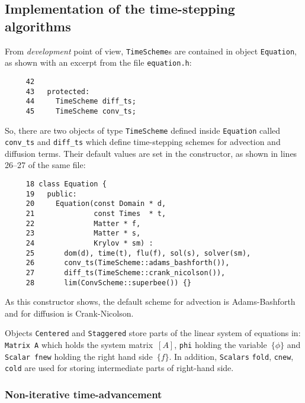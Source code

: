 \subsection{Implementation of the time-stepping algorithms}

\noindent
From {\em development} point of view, {\tt TimeScheme}s are contained in object 
{\tt Equation}, as shown with an excerpt from the file 
{\tt equation.h}:
%
{\small \begin{verbatim}
     42
     43   protected:
     44     TimeScheme diff_ts;
     45     TimeScheme conv_ts;
\end{verbatim}}
%
So, there are two objects of type {\tt TimeScheme} defined inside {\tt Equation}
called {\tt conv\_ts} and {\tt diff\_ts} which define time-stepping schemes for
advection and diffusion terms. Their default values are set in the constructor,
as shown in lines 26--27 of the same file:
%
{\small \begin{verbatim}
     18 class Equation {
     19   public:
     20     Equation(const Domain * d,
     21              const Times  * t,
     22              Matter * f,
     23              Matter * s,
     24              Krylov * sm) :
     25       dom(d), time(t), flu(f), sol(s), solver(sm),
     26       conv_ts(TimeScheme::adams_bashforth()),
     27       diff_ts(TimeScheme::crank_nicolson()),
     28       lim(ConvScheme::superbee()) {}
\end{verbatim}}
%
As this constructor shows, the default scheme for advection is Adams-Bashforth
and for diffusion is Crank-Nicolson.  

Objects {\tt Centered} and {\tt Staggered} store parts of the linear system of
equations in: {\tt Matrix A} which holds the system matrix~$[A]$, {\tt phi} 
holding the variable~$\{\phi\}$ and {\tt Scalar fnew} holding the right hand
side~$\{f\}$. In addition, {\tt Scalars} {\tt fold}, {\tt cnew}, {\tt cold}
are used for storing intermediate parts of right-hand side.

\subsubsection{Non-iterative time-advancement}

